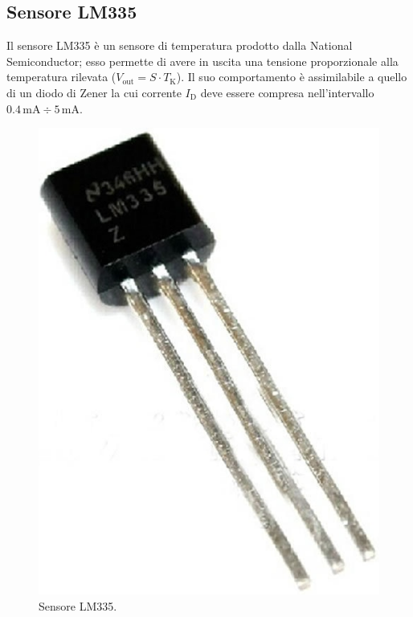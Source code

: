 \documentclass[a4paper]{article}
\begin{document}
		\subsection{Sensore LM335}
			Il sensore LM335 è un sensore di temperatura prodotto dalla National Semiconductor; esso permette di avere in uscita una tensione proporzionale alla temperatura rilevata ($ V_{\mathrm{out}} = S \cdot T_{\mathrm{K}} $).
			\newline
			Il suo comportamento è assimilabile a quello di un diodo di Zener la cui corrente $ I_{\mathrm{D}} $ deve essere compresa nell'intervallo $ 0.4 \, \mathrm{mA} \div 5 \, \mathrm{mA} $.
			\begin{figure}[h!]
				\centering
				\includegraphics[scale=0.2]{LM335}
				\caption{Sensore LM335.}
				\label{fig:LM335}
			\end{figure}
\end{document}
